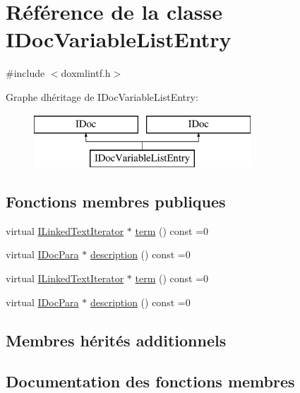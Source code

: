 \hypertarget{class_i_doc_variable_list_entry}{}\section{Référence de la classe I\+Doc\+Variable\+List\+Entry}
\label{class_i_doc_variable_list_entry}


{\ttfamily \#include $<$doxmlintf.\+h$>$}

Graphe d\textquotesingle{}héritage de I\+Doc\+Variable\+List\+Entry\+:\begin{figure}[H]
\begin{center}
\leavevmode
\includegraphics[height=2.000000cm]{class_i_doc_variable_list_entry}
\end{center}
\end{figure}
\subsection*{Fonctions membres publiques}
\begin{DoxyCompactItemize}
\item 
virtual \hyperlink{class_i_linked_text_iterator}{I\+Linked\+Text\+Iterator} $\ast$ \hyperlink{class_i_doc_variable_list_entry_a845e9642d92bf28114544f05ac0d2206}{term} () const  =0
\item 
virtual \hyperlink{class_i_doc_para}{I\+Doc\+Para} $\ast$ \hyperlink{class_i_doc_variable_list_entry_a1bebeb34551b448c95599cf2c40a2f74}{description} () const  =0
\item 
virtual \hyperlink{class_i_linked_text_iterator}{I\+Linked\+Text\+Iterator} $\ast$ \hyperlink{class_i_doc_variable_list_entry_a845e9642d92bf28114544f05ac0d2206}{term} () const  =0
\item 
virtual \hyperlink{class_i_doc_para}{I\+Doc\+Para} $\ast$ \hyperlink{class_i_doc_variable_list_entry_a1bebeb34551b448c95599cf2c40a2f74}{description} () const  =0
\end{DoxyCompactItemize}
\subsection*{Membres hérités additionnels}


\subsection{Documentation des fonctions membres}
\hypertarget{class_i_doc_variable_list_entry_a1bebeb34551b448c95599cf2c40a2f74}{}
